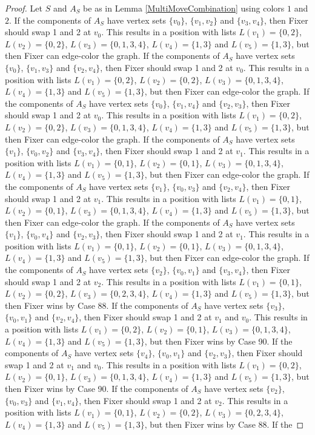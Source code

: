 \documentclass[12pt]{amsart}
\theoremstyle{plain}
\theoremstyle{definition}
\theoremstyle{remark}
\begin{document}
\begin{proof}
Let $S$ and $A_S$ be as in Lemma \ref{MultiMoveCombination} using colors $1$ and $2$. If the components of $A_S$ have vertex sets $\{v_0\}$, $\{v_1, v_2\}$ and $\{v_3, v_4\}$, then Fixer should swap 1 and 2 at $v_0$. This results in a position with lists $L(v_1) = \{0, 2\}$, $L(v_2) = \{0, 2\}$, $L(v_3) = \{0, 1, 3, 4\}$, $L(v_4) = \{1, 3\}$ and $L(v_5) = \{1, 3\}$, but then Fixer can edge-color the graph. If the components of $A_S$ have vertex sets $\{v_0\}$, $\{v_1, v_3\}$ and $\{v_2, v_4\}$, then Fixer should swap 1 and 2 at $v_0$. This results in a position with lists $L(v_1) = \{0, 2\}$, $L(v_2) = \{0, 2\}$, $L(v_3) = \{0, 1, 3, 4\}$, $L(v_4) = \{1, 3\}$ and $L(v_5) = \{1, 3\}$, but then Fixer can edge-color the graph. If the components of $A_S$ have vertex sets $\{v_0\}$, $\{v_1, v_4\}$ and $\{v_2, v_3\}$, then Fixer should swap 1 and 2 at $v_0$. This results in a position with lists $L(v_1) = \{0, 2\}$, $L(v_2) = \{0, 2\}$, $L(v_3) = \{0, 1, 3, 4\}$, $L(v_4) = \{1, 3\}$ and $L(v_5) = \{1, 3\}$, but then Fixer can edge-color the graph. If the components of $A_S$ have vertex sets $\{v_1\}$, $\{v_0, v_2\}$ and $\{v_3, v_4\}$, then Fixer should swap 1 and 2 at $v_1$. This results in a position with lists $L(v_1) = \{0, 1\}$, $L(v_2) = \{0, 1\}$, $L(v_3) = \{0, 1, 3, 4\}$, $L(v_4) = \{1, 3\}$ and $L(v_5) = \{1, 3\}$, but then Fixer can edge-color the graph. If the components of $A_S$ have vertex sets $\{v_1\}$, $\{v_0, v_3\}$ and $\{v_2, v_4\}$, then Fixer should swap 1 and 2 at $v_1$. This results in a position with lists $L(v_1) = \{0, 1\}$, $L(v_2) = \{0, 1\}$, $L(v_3) = \{0, 1, 3, 4\}$, $L(v_4) = \{1, 3\}$ and $L(v_5) = \{1, 3\}$, but then Fixer can edge-color the graph. If the components of $A_S$ have vertex sets $\{v_1\}$, $\{v_0, v_4\}$ and $\{v_2, v_3\}$, then Fixer should swap 1 and 2 at $v_1$. This results in a position with lists $L(v_1) = \{0, 1\}$, $L(v_2) = \{0, 1\}$, $L(v_3) = \{0, 1, 3, 4\}$, $L(v_4) = \{1, 3\}$ and $L(v_5) = \{1, 3\}$, but then Fixer can edge-color the graph. If the components of $A_S$ have vertex sets $\{v_2\}$, $\{v_0, v_1\}$ and $\{v_3, v_4\}$, then Fixer should swap 1 and 2 at $v_2$. This results in a position with lists $L(v_1) = \{0, 1\}$, $L(v_2) = \{0, 2\}$, $L(v_3) = \{0, 2, 3, 4\}$, $L(v_4) = \{1, 3\}$ and $L(v_5) = \{1, 3\}$, but then Fixer wins by Case 88. If the components of $A_S$ have vertex sets $\{v_3\}$, $\{v_0, v_1\}$ and $\{v_2, v_4\}$, then Fixer should swap 1 and 2 at $v_1$ and $v_0$. This results in a position with lists $L(v_1) = \{0, 2\}$, $L(v_2) = \{0, 1\}$, $L(v_3) = \{0, 1, 3, 4\}$, $L(v_4) = \{1, 3\}$ and $L(v_5) = \{1, 3\}$, but then Fixer wins by Case 90. If the components of $A_S$ have vertex sets $\{v_4\}$, $\{v_0, v_1\}$ and $\{v_2, v_3\}$, then Fixer should swap 1 and 2 at $v_1$ and $v_0$. This results in a position with lists $L(v_1) = \{0, 2\}$, $L(v_2) = \{0, 1\}$, $L(v_3) = \{0, 1, 3, 4\}$, $L(v_4) = \{1, 3\}$ and $L(v_5) = \{1, 3\}$, but then Fixer wins by Case 90. If the components of $A_S$ have vertex sets $\{v_2\}$, $\{v_0, v_3\}$ and $\{v_1, v_4\}$, then Fixer should swap 1 and 2 at $v_2$. This results in a position with lists $L(v_1) = \{0, 1\}$, $L(v_2) = \{0, 2\}$, $L(v_3) = \{0, 2, 3, 4\}$, $L(v_4) = \{1, 3\}$ and $L(v_5) = \{1, 3\}$, but then Fixer wins by Case 88. If the 
\end{proof}
\end{document}
